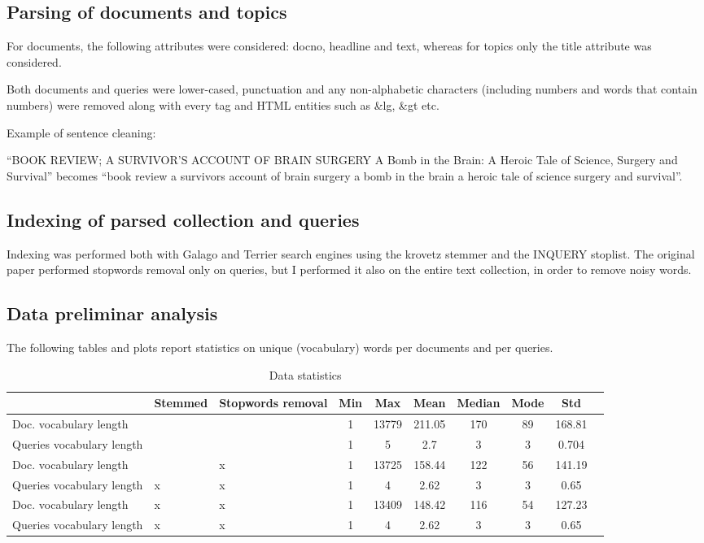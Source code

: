 \subsection{Parsing of documents and topics}

For documents, the following attributes were considered: docno, headline and text, whereas for topics only the title attribute was considered.

Both documents and queries were lower-cased, punctuation and any non-alphabetic characters (including numbers and words that contain numbers) were removed along with every tag and HTML entities such as \&lg, \&gt etc.

Example of sentence cleaning:

``BOOK REVIEW; A SURVIVOR'S ACCOUNT OF BRAIN SURGERY A Bomb in the Brain: A Heroic Tale of Science, Surgery and Survival'' becomes ``book review a survivors account of brain surgery a bomb in the brain a heroic tale of science surgery and survival''.

\subsection{Indexing of parsed collection and queries}

Indexing was performed both with Galago and Terrier search engines using the krovetz stemmer and the INQUERY stoplist. The original paper performed stopwords removal only on queries, but I performed it also on the entire text collection, in order to remove noisy words.

\subsection{Data preliminar analysis}

The following tables and plots report statistics on unique (vocabulary) words per documents and per queries.

\begin{table}[H]
\centering
\begin{tabular}{p{2cm}p{1.5cm}p{2cm}ccccccc}
 & Stemmed & Stopwords removal & Min & Max & Mean & Median & Mode & Std \\ \hline
Doc. vocabulary length & & & 1 & 13779 & 211.05 & 170 & 89 & 168.81 \\ \hline
Queries vocabulary length & & & 1 & 5 & 2.7 & 3 & 3 & 0.704 \\ \hline
Doc. vocabulary length & & x & 1 & 13725 & 158.44 & 122 & 56 & 141.19 \\ \hline
Queries vocabulary length & x & x & 1 & 4 & 2.62 & 3 & 3 & 0.65 \\ \hline
Doc. vocabulary length & x & x & 1 & 13409 & 148.42 & 116 & 54 & 127.23 \\ \hline
Queries vocabulary length & x & x & 1 & 4 & 2.62 & 3 & 3 & 0.65 \\ \hline
\end{tabular}
\caption{Data statistics}
\label{table:DataMeasures}
\end{table}

